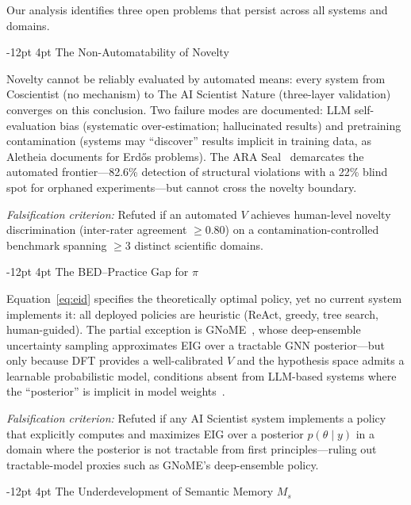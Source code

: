 \documentclass[11pt]{article}
\makeatletter
\renewcommand\subsection{\@startsection{subsection}{2}{\z@}%
  {-12pt \@plus -2pt \@minus -2pt}%
  {4pt \@plus 1pt}%
  {\normalfont\normalsize\bfseries}}
\makeatother
\begin{document}
Our analysis identifies three open problems that persist across all systems and domains.

\subsection{The Non-Automatability of Novelty}

Novelty cannot be reliably evaluated by automated means: every system from Coscientist (no mechanism) to The AI Scientist Nature (three-layer validation) converges on this conclusion. Two failure modes are documented: LLM self-evaluation bias (systematic over-estimation; hallucinated results) and pretraining contamination (systems may ``discover'' results implicit in training data, as Aletheia documents for Erd\H{o}s problems). The ARA Seal~\citep{liu2026lasthuman} demarcates the automated frontier---82.6\% detection of structural violations with a 22\% blind spot for orphaned experiments---but cannot cross the novelty boundary.

\textit{Falsification criterion:} Refuted if an automated $V$ achieves human-level novelty discrimination (inter-rater agreement $\geq$0.80) on a contamination-controlled benchmark spanning $\geq$3 distinct scientific domains.

\subsection{The BED--Practice Gap for $\pi$}

Equation~\ref{eq:eid} specifies the theoretically optimal policy, yet no current system implements it: all deployed policies are heuristic (ReAct, greedy, tree search, human-guided). The partial exception is GNoME~\citep{merchant2023gnome}, whose deep-ensemble uncertainty sampling approximates EIG over a tractable GNN posterior---but only because DFT provides a well-calibrated $V$ and the hypothesis space admits a learnable probabilistic model, conditions absent from LLM-based systems where the ``posterior'' is implicit in model weights~\citep{foster2021dad}.

\textit{Falsification criterion:} Refuted if any AI Scientist system implements a policy that explicitly computes and maximizes EIG over a posterior $p(\theta \mid y)$ in a domain where the posterior is not tractable from first principles---ruling out tractable-model proxies such as GNoME's deep-ensemble policy.

\subsection{The Underdevelopment of Semantic Memory $M_s$}
\end{document}
